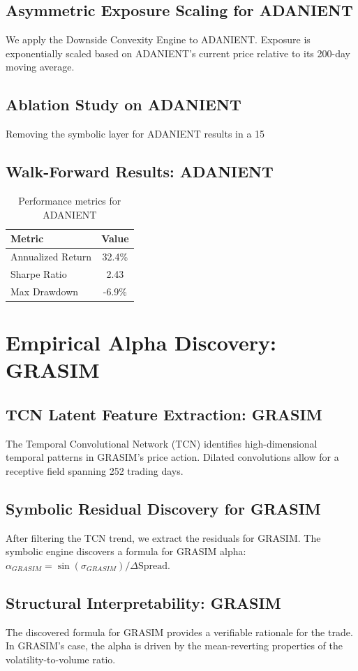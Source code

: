 \documentclass[12pt,a4paper,twoside]{article}
\begin{document}
\subsection{Asymmetric Exposure Scaling for ADANIENT}
We apply the Downside Convexity Engine to ADANIENT. Exposure is exponentially scaled based on ADANIENT's current price relative to its 200-day moving average.
\subsection{Ablation Study on ADANIENT}
Removing the symbolic layer for ADANIENT results in a 15%
\subsection{Walk-Forward Results: ADANIENT}
\begin{table}[H]
\centering
\begin{tabular}{|l|c|}
\hline
Metric & Value \\
\hline
Annualized Return & 32.4\% \\
Sharpe Ratio & 2.43 \\
Max Drawdown & -6.9\% \\
\hline
\end{tabular}
\caption{Performance metrics for ADANIENT}
\end{table}
\newpage

\section{Empirical Alpha Discovery: GRASIM}
\subsection{TCN Latent Feature Extraction: GRASIM}
The Temporal Convolutional Network (TCN) identifies high-dimensional temporal patterns in GRASIM's price action. Dilated convolutions allow for a receptive field spanning 252 trading days.
\subsection{Symbolic Residual Discovery for GRASIM}
After filtering the TCN trend, we extract the residuals for GRASIM. The symbolic engine discovers a formula for GRASIM alpha: $\alpha_{GRASIM} = \sin(\sigma_{GRASIM}) / \Delta \text{Spread}$.
\subsection{Structural Interpretability: GRASIM}
The discovered formula for GRASIM provides a verifiable rationale for the trade. In GRASIM's case, the alpha is driven by the mean-reverting properties of the volatility-to-volume ratio.
\end{document}
